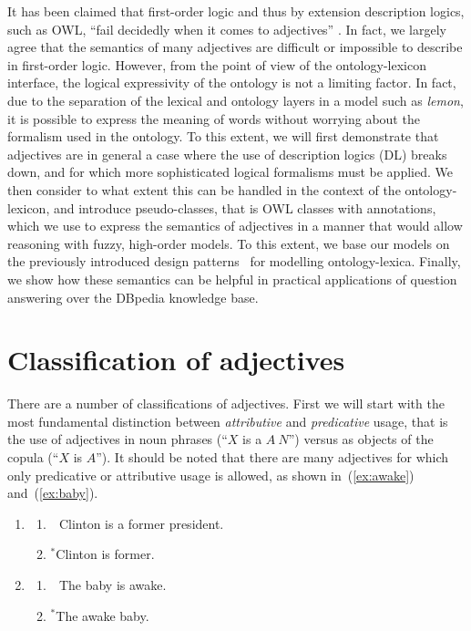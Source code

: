 \documentclass[11pt]{article}
\begin{document}
It has been claimed that first-order logic and thus by extension description 
logics, such as OWL, ``fail decidedly when it comes to adjectives''
\cite{bankston2003modeling}. In fact, we largely agree that the semantics 
of many adjectives are difficult or impossible to describe in first-order logic. 
However, from the point of view of the ontology-lexicon interface, the logical 
expressivity of the ontology is not a limiting factor. In fact, due to the 
separation of the lexical and ontology layers in a model such as \emph{lemon}, 
it is possible to express the meaning of words without worrying about the 
formalism used in the ontology. To this extent, we will first demonstrate that 
adjectives are in general a case where the use of description logics (DL) breaks down, 
and for which more sophisticated logical formalisms must be applied. We then 
consider to what extent this can be handled in the context of the 
ontology-lexicon, and introduce pseudo-classes, that is OWL classes with 
annotations, which we use to express the semantics of adjectives in a manner
that would allow reasoning with fuzzy, high-order models. To this extent, we base
our models on the previously introduced design patterns~\cite{mccrae2014design}
for modelling ontology-lexica. 
Finally, we show how these semantics can be helpful in practical applications 
of question answering over the DBpedia knowledge base.

\section{Classification of adjectives}

There are a number of classifications of adjectives. First we will start 
with the most fundamental distinction between \emph{attributive} and 
\emph{predicative} usage, that is the use of adjectives in noun phrases 
(``$X$ is a $A~N$'') versus as objects of the copula (``$X$ is $A$''). 
It should be noted that there are many adjectives for which only predicative or 
attributive usage is allowed, as shown in~(\ref{ex:awake}) and~(\ref{ex:baby}).

\begin{enumerate}
\item \begin{enumerate}	
\item \ \,Clinton is a former president.
\item $^\ast$Clinton is former.
\end{enumerate}
\label{ex:technical}
\item \begin{enumerate}	
        \item \ \,The baby is awake. \label{ex:awake}
\item $^\ast$The awake baby.
\end{enumerate}
\label{ex:baby}
\end{enumerate}
\end{document}
